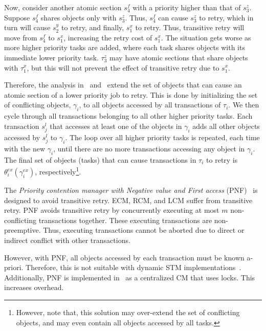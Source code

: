\documentclass[prodmode,acmtecs]{acmsmall}
\begin{document}
Now, consider another atomic section $s_4^f$ with a priority higher than that of $s_3^z$. Suppose $s_4^f$ shares objects only with $s_3^z$. Thus, $s_4^f$ can cause $s_3^z$ to retry, which in turn will cause $s_2^y$ to retry, and finally, $s_1^x$ to retry. Thus, transitive retry will move from $s_{4}^{f}$ to $s_{1}^{x}$, increasing the retry cost of $s_{1}^{x}$. The situation gets worse as more higher priority tasks are added, where each task shares objects with its immediate lower priority task. $\tau_{3}^{z}$ may have atomic sections that share objects with $\tau_{1}^{x}$,
but this will not prevent the effect of transitive retry due to $s_{1}^{x}$.



Therefore, the analysis in~\cite{stmconcurrencycontrol:emsoft11} and~\cite{lcmdac2012} extend the set of objects that can cause an atomic section of a lower priority job to retry.  This is done by initializing the set of conflicting objects, $\gamma_i$, to all objects accessed by all transactions of $\tau_i$. We then cycle through all transactions belonging to all other higher priority tasks. Each transaction $s_j^l$ that accesses at least one of the objects in $\gamma_i$ adds all other objects accessed by $s_j^l$ to $\gamma_i$. The loop over all higher priority tasks is repeated, each time with the new $\gamma_i$, until there are no more transactions accessing any object in $\gamma_i$. The final set of objects (tasks) that can cause transactions in $\tau_i$ to retry is $\theta_i^{ex}(\gamma_i^{ex})$, respectively\footnote{However, note that, this solution may over-extend the set of conflicting objects, and may even contain all objects accessed by all tasks.}. 

The \textit{Priority contention manager with Negative value and First access} (PNF)~\cite{shambake_phd_proposal} is designed to avoid transitive retry. ECM, RCM, and LCM suffer from transitive retry. PNF avoids transitive retry by concurrently executing at most $m$ non-conflicting transactions together. These executing transactions are non-preemptive. Thus, executing transactions cannot be aborted due to direct or indirect conflict with other transactions.

However, with PNF, all objects accessed by each transaction must be known a-priori. Therefore, this is not suitable with dynamic STM implementations~\cite{Herlihy:2003:STM:872035.872048}. Additionally, PNF is implemented in~\cite{shambake_phd_proposal} as a centralized CM that uses locks. This increases overhead. 
\end{document}
